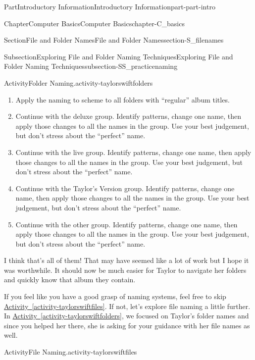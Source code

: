 \documentclass[oneside,10pt,]{book}
\newcommand{\xreffont}{\relax}
\begin{document}
\begin{partptx}{Part}{Introductory Information}{}{Introductory Information}{}{}{part-part-intro}
\begin{chapterptx}{Chapter}{Computer Basics}{}{Computer Basics}{}{}{chapter-C_basics}
\begin{sectionptx}{Section}{File and Folder Names}{}{File and Folder Names}{}{}{section-S_filenames}
\begin{subsectionptx}{Subsection}{Exploring File and Folder Naming Techniques}{}{Exploring File and Folder Naming Techniques}{}{}{subsection-SS_practicenaming}
\begin{activity}{Activity}{Folder Naming.}{activity-taylorswiftfolders}
\begin{enumerate}[font=\bfseries,label=(\alph*),ref=\alph*]
\par
Now that we have groups, we can figure out how to name one of each group, then apply that naming style to all names in the group. Start with the standard albums, such as ``Taylor Swift''. How can you change this name to stick with the conventions discussed above?%
\item{}Apply the naming to scheme to all folders with ``regular'' album titles.%
\item{}Continue with the deluxe group. Identify patterns, change one name, then apply those changes to all the names in the group. Use your best judgement, but don't stress about the ``perfect'' name.%
\item{}Continue with the live group. Identify patterns, change one name, then apply those changes to all the names in the group. Use your best judgement, but don't stress about the ``perfect'' name.%
\item{}Continue with the Taylor's Version group. Identify patterns, change one name, then apply those changes to all the names in the group. Use your best judgement, but don't stress about the ``perfect'' name.%
\item{}Continue with the other group. Identify patterns, change one name, then apply those changes to all the names in the group. Use your best judgement, but don't stress about the ``perfect'' name.%
\end{enumerate}%
I think that's all of them! That may have seemed like a lot of work but I hope it was worthwhile. It should now be much easier for Taylor to navigate her folders and quickly know that album they contain.%
\end{activity}%
If you feel like you have a good grasp of naming systems, feel free to skip \hyperref[activity-taylorswiftfiles]{Activity~{\xreffont\ref{activity-taylorswiftfiles}}}. If not, let's explore file naming a little further. In \hyperref[activity-taylorswiftfolders]{Activity~{\xreffont\ref{activity-taylorswiftfolders}}}, we focused on Taylor's folder names and since you helped her there, she is asking for your guidance with her file names as well.%
\begin{activity}{Activity}{File Naming.}{activity-taylorswiftfiles}%
%

\end{activity}
\end{subsectionptx}
\end{sectionptx}
\end{chapterptx}
\end{partptx}
\end{document}
